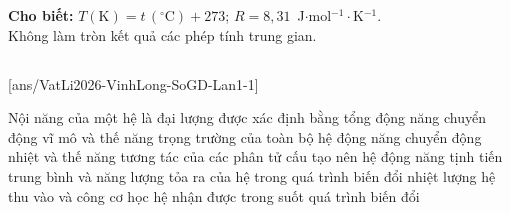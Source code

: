 \def\CheDo{solcolor}%
\def\tenchuong{Sở GD\&ĐT Vĩnh Long -- Lần 1}
\def\thuonghieu{VẬT LÍ 12 -- Eduzy.com.vn}
\def\TachCauDS{1}
\def\TachCauLG{1}




	\noindent\textbf{Cho biết:} $T(\text{K})=t\,(^\circ\text{C})+273$; $R=8{,}31$~J$\cdot$mol$^{-1}\cdot$K$^{-1}$.\\
	Không làm tròn kết quả các phép tính trung gian.

	\noindent
	\subsection*{}
	\setcounter{ex}{0}
	[ans/VatLi2026-VinhLong-SoGD-Lan1-1]

	\begin{ex}%
		Nội năng của một hệ là đại lượng được xác định bằng tổng
		\choice
		{động năng chuyển động vĩ mô và thế năng trọng trường của toàn bộ hệ}
		{\True động năng chuyển động nhiệt và thế năng tương tác của các phân tử cấu tạo nên hệ}
		{động năng tịnh tiến trung bình và năng lượng tỏa ra của hệ trong quá trình biến đổi}
		{nhiệt lượng hệ thu vào và công cơ học hệ nhận được trong suốt quá trình biến đổi}
	\end{ex}

